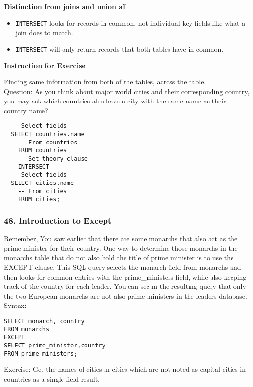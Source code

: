 \documentclass[
]{article}
\providecommand{\tightlist}{%
  \setlength{\itemsep}{0pt}\setlength{\parskip}{0pt}}
\begin{document}
\textbf{Distinction from joins and union all}

\begin{itemize}
\tightlist
\item
  \texttt{INTERSECT} looks for records in common, not individual key
  fields like what a join does to match.
\item
  \texttt{INTERSECT} will only return records that both tables have in
  common.
\end{itemize}

\textbf{Instruction for Exercise}

Finding same information from both of the tables, across the table.\\
Question: As you think about major world cities and their corresponding
country, you may ask which countries also have a city with the same name
as their country name?

\begin{verbatim}
  -- Select fields
  SELECT countries.name
    -- From countries
    FROM countries
    -- Set theory clause
    INTERSECT
  -- Select fields
  SELECT cities.name
    -- From cities
    FROM cities;
\end{verbatim}

\hypertarget{introduction-to-except}{%
\subsubsection{48. Introduction to
Except}\label{introduction-to-except}}

Remember, You saw earlier that there are some monarchs that also act as
the prime minister for their country. One way to determine those
monarchs in the monarchs table that do not also hold the title of prime
minister is to use the EXCEPT clause. This SQL query selects the monarch
field from monarchs and then looks for common entries with the
prime\_ministers field, while also keeping track of the country for each
leader. You can see in the resulting query that only the two European
monarchs are not also prime ministers in the leaders database.\\
Syntax:

\begin{verbatim}
SELECT monarch, country
FROM monarchs
EXCEPT 
SELECT prime_minister,country
FROM prime_ministers;
\end{verbatim}

Exercise: Get the names of cities in cities which are not noted as
capital cities in countries as a single field result.
\end{document}
